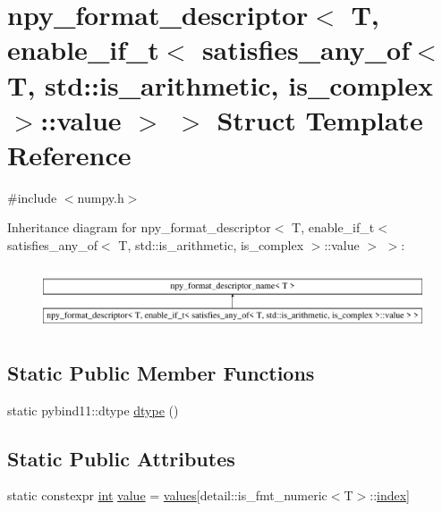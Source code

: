 \hypertarget{structnpy__format__descriptor_3_01_t_00_01enable__if__t_3_01satisfies__any__of_3_01_t_00_01std_19664305ecd151fe63e888175be34ab54}{}\section{npy\+\_\+format\+\_\+descriptor$<$ T, enable\+\_\+if\+\_\+t$<$ satisfies\+\_\+any\+\_\+of$<$ T, std\+::is\+\_\+arithmetic, is\+\_\+complex $>$\+::value $>$ $>$ Struct Template Reference}
\label{structnpy__format__descriptor_3_01_t_00_01enable__if__t_3_01satisfies__any__of_3_01_t_00_01std_19664305ecd151fe63e888175be34ab54}


{\ttfamily \#include $<$numpy.\+h$>$}

Inheritance diagram for npy\+\_\+format\+\_\+descriptor$<$ T, enable\+\_\+if\+\_\+t$<$ satisfies\+\_\+any\+\_\+of$<$ T, std\+::is\+\_\+arithmetic, is\+\_\+complex $>$\+::value $>$ $>$\+:\begin{figure}[H]
\begin{center}
\leavevmode
\includegraphics[height=1.854305cm]{structnpy__format__descriptor_3_01_t_00_01enable__if__t_3_01satisfies__any__of_3_01_t_00_01std_19664305ecd151fe63e888175be34ab54}
\end{center}
\end{figure}
\subsection*{Static Public Member Functions}
\begin{DoxyCompactItemize}
\item 
static pybind11\+::dtype \mbox{\hyperlink{structnpy__format__descriptor_3_01_t_00_01enable__if__t_3_01satisfies__any__of_3_01_t_00_01std_19664305ecd151fe63e888175be34ab54_a19c914b27b36fdbdb70e6318e8065e6e}{dtype}} ()
\end{DoxyCompactItemize}
\subsection*{Static Public Attributes}
\begin{DoxyCompactItemize}
\item 
static constexpr \mbox{\hyperlink{warnings_8h_a74f207b5aa4ba51c3a2ad59b219a423b}{int}} \mbox{\hyperlink{structnpy__format__descriptor_3_01_t_00_01enable__if__t_3_01satisfies__any__of_3_01_t_00_01std_19664305ecd151fe63e888175be34ab54_abce30595c9f88fad1ca546c8940c3b2b}{value}} = \mbox{\hyperlink{_s_d_l__opengl__glext_8h_a0aa8cf39c79d294b1d9f4daef5020bec}{values}}\mbox{[}detail\+::is\+\_\+fmt\+\_\+numeric$<$T$>$\+::\mbox{\hyperlink{_s_d_l__opengl__glext_8h_a57f14e05b1900f16a2da82ade47d0c6d}{index}}\mbox{]}
\end{DoxyCompactItemize}


